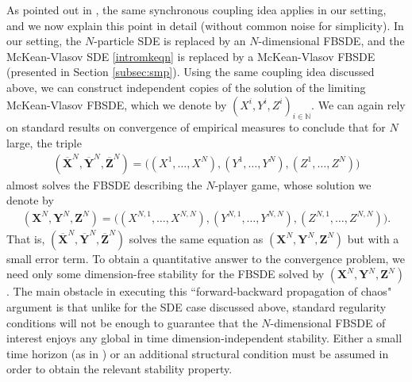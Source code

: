 \documentclass[11pt,reqno]{amsart}
\numberwithin{equation}{section}
\theoremstyle{definition}
\def\N{{\mathbb N}}
\newcommand{\bX}{\mathbf{X}}
\newcommand{\bY}{\mathbf{Y}}
\newcommand{\bZ}{\mathbf{Z}}
\newcommand{\ov}{\overline}
\def \N{\mathbb{N}}
\begin{document}
As pointed out in \cite{laurieretangpi}, the same synchronous coupling idea applies in our setting, and we now explain this point in detail (without common noise for simplicity). In our setting, the $N$-particle SDE is replaced by an $N$-dimensional FBSDE, and the McKean-Vlasov SDE \eqref{intromkeqn} is replaced by a McKean-Vlasov FBSDE (presented in Section \ref{subsec:smp}). Using the same coupling idea discussed above, we can construct independent copies of the solution of the limiting McKean-Vlasov FBSDE, which we denote by $(X^i, Y^i, Z^i)_{i \in \N}$. We can again rely on standard results on convergence of empirical measures to conclude that for $N$ large, the triple 
\begin{align*}
(\ov{\bX}^N, \ov{\bY}^N, \ov{\bZ}^N) = \Big((X^1,\dots,X^N), (Y^1,\dots,Y^N), (Z^1,\dots,Z^N) \Big)
\end{align*}
almost solves the FBSDE describing the $N$-player game, whose solution we denote by 
\begin{align*}
(\bX^N,\bY^N,\bZ^N) = \big((X^{N,1},\dots,X^{N,N}), (Y^{N,1},\dots,Y^{N,N}), (Z^{N,1},\dots,Z^{N,N}) \big). 
\end{align*}
That is, $(\ov{\bX}^N,\ov{\bY}^N, \ov{\bZ}^N)$ solves the same equation as $(\bX^N,\bY^N,\bZ^N)$ but with a small error term. To obtain a quantitative answer to the convergence problem, we need only some dimension-free stability for the FBSDE solved by $(\bX^N,\bY^N,\bZ^N)$. 
The main obstacle in executing this ``forward-backward propagation of chaos" argument is that unlike for the SDE case discussed above, standard regularity conditions will not be enough to guarantee that the $N$-dimensional FBSDE of interest enjoys any global in time dimension-independent stability. Either a small time horizon (as in \cite{laurieretangpi}) or an additional structural condition must be assumed in order to obtain the relevant stability property.
\end{document}
